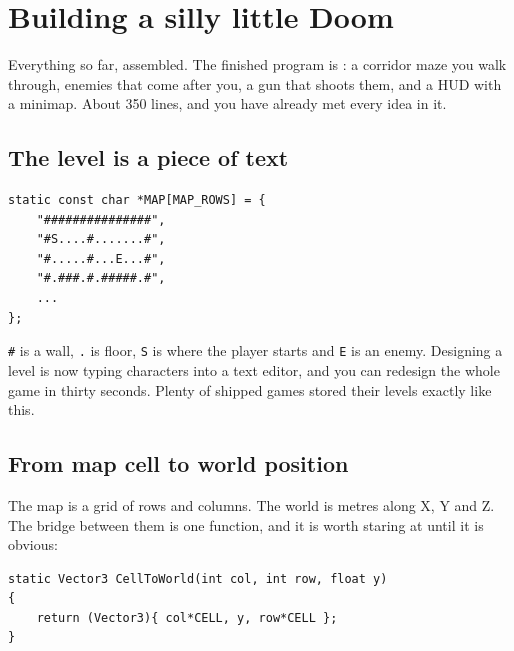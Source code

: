\chapter{Building a silly little Doom}

Everything so far, assembled. The finished program is
: a corridor maze you walk through, enemies
that come after you, a gun that shoots them, and a HUD with a minimap. About 350
lines, and you have already met every idea in it.


\section{The level is a piece of text}

\begin{lstlisting}
static const char *MAP[MAP_ROWS] = {
    "###############",
    "#S....#.......#",
    "#.....#...E...#",
    "#.###.#.#####.#",
    ...
};
\end{lstlisting}

\lstinline|#| is a wall, \lstinline|.| is floor, \lstinline|S| is where the
player starts and \lstinline|E| is an enemy. Designing a level is now typing
characters into a text editor, and you can redesign the whole game in thirty
seconds. Plenty of shipped games stored their levels exactly like this.

\section{From map cell to world position}

The map is a grid of rows and columns. The world is metres along X, Y and Z. The
bridge between them is one function, and it is worth staring at until it is
obvious:

\begin{lstlisting}
static Vector3 CellToWorld(int col, int row, float y)
{
    return (Vector3){ col*CELL, y, row*CELL };
}
\end{lstlisting}

